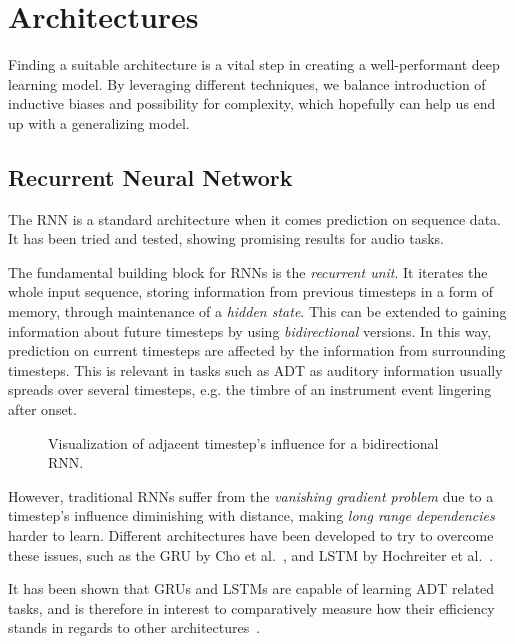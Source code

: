 \chapter{Architectures}\label{Architectures}

Finding a suitable architecture is a vital step in creating a well-performant deep learning model. By leveraging different techniques, we balance introduction of inductive biases and possibility for complexity, which hopefully can help us end up with a generalizing model.

\section{Recurrent Neural Network}

The \gls{RNN} is a standard architecture when it comes prediction on sequence data. It has been tried and tested, showing promising results for audio tasks.

The fundamental building block for \gls{RNN}s is the \textit{recurrent unit}. It iterates the whole input sequence, storing information from previous timesteps in a form of memory, through maintenance of a \textit{hidden state}. This can be extended to gaining information about future timesteps by using \textit{bidirectional} versions. In this way, prediction on current timesteps are affected by the information from surrounding timesteps. This is relevant in tasks such as \gls{ADT} as auditory information usually spreads over several timesteps, e.g. the timbre of an instrument event lingering after onset.

\begin{figure}[H]
    \centering
    
    \caption{Visualization of adjacent timestep's influence for a bidirectional RNN.}
    \label{RNNInfluenceFigure}
\end{figure}

However, traditional \gls{RNN}s suffer from the \textit{vanishing gradient problem} due to a timestep's influence diminishing with distance, making \textit{long range dependencies} harder to learn. Different architectures have been developed to try to overcome these issues, such as the \gls{GRU} by Cho et al.~\cite{DBLP:conf/emnlp/ChoMGBBSB14}, and \gls{LSTM} by Hochreiter et al.~\cite{10.1162/neco.1997.9.8.1735}.

It has been shown that \gls{GRU}s and \gls{LSTM}s are capable of learning \gls{ADT} related tasks, and is therefore in interest to comparatively measure how their efficiency stands in regards to other architectures~\cite{Southall2016AutomaticDT, inproceedings, Vogl2017DrumTV, signals4040042}.

